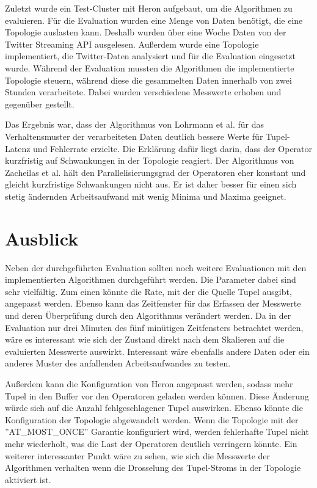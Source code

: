 Zuletzt wurde ein Test-Cluster mit Heron aufgebaut, um die Algorithmen zu evaluieren.
Für die Evaluation wurden eine Menge von Daten benötigt, die eine Topologie auslasten kann.
Deshalb wurden über eine Woche Daten von der Twitter Streaming API ausgelesen.
Außerdem wurde eine Topologie implementiert, die Twitter-Daten analysiert und für die Evaluation eingesetzt wurde.
Während der Evaluation mussten die Algorithmen die implementierte Topologie steuern, während diese die gesammelten Daten innerhalb von zwei Stunden verarbeitete.
Dabei wurden verschiedene Messwerte erhoben und gegenüber gestellt.

Das Ergebnis war, dass der Algorithmus von Lohrmann et al. für das Verhaltensmuster der verarbeiteten Daten deutlich bessere Werte für Tupel-Latenz und Fehlerrate erzielte.
Die Erklärung dafür liegt darin, dass der Operator kurzfristig auf Schwankungen in der Topologie reagiert.
Der Algorithmus von Zacheilas et al. hält den Parallelisierungsgrad der Operatoren eher konstant und gleicht kurzfristige Schwankungen nicht aus.
Er ist daher besser für einen sich stetig ändernden Arbeitsaufwand mit wenig Minima und Maxima geeignet.

\section*{Ausblick}

Neben der durchgeführten Evaluation sollten noch weitere Evaluationen mit den implementierten Algorithmen durchgeführt werden.
Die Parameter dabei sind sehr vielfältig.
Zum einen könnte die Rate, mit der die Quelle Tupel ausgibt, angepasst werden.
Ebenso kann das Zeitfenster für das Erfassen der Messwerte und deren Überprüfung durch den Algorithmus verändert werden.
Da in der Evaluation nur drei Minuten des fünf minütigen Zeitfensters betrachtet werden, wäre es interessant wie sich der Zustand direkt nach dem Skalieren auf die evaluierten Messwerte auswirkt.
Interessant wäre ebenfalls andere Daten oder ein anderes Muster des anfallenden Arbeitsaufwandes zu testen.

Außerdem kann die Konfiguration von Heron angepasst werden, sodass mehr Tupel in den Buffer vor den Operatoren geladen werden können.
Diese Änderung würde sich auf die Anzahl fehlgeschlagener Tupel auswirken.
Ebenso könnte die Konfiguration der Topologie abgewandelt werden.
Wenn die Topologie mit der ''AT\_MOST\_ONCE'' Garantie konfiguriert wird, werden fehlerhafte Tupel nicht mehr wiederholt,
was die Last der Operatoren deutlich verringern könnte.
Ein weiterer interessanter Punkt wäre zu sehen, wie sich die Messwerte der Algorithmen verhalten wenn die Drosselung des Tupel-Stroms in der Topologie aktiviert ist.

